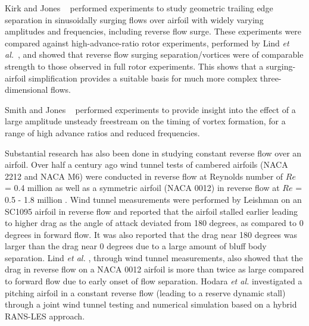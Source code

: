 Kirk and Jones ~\cite{bib:kirk_jones_2019} performed experiments to study geometric trailing edge separation in sinusoidally surging flows over airfoil with widely varying amplitudes and frequencies, including reverse flow surge. These experiments were compared against high-advance-ratio rotor experiments, performed by 
Lind \textit{et al.}~\cite{bib:Lind2018}, and showed that reverse flow surging separation/vortices were of comparable strength to those observed in full rotor experiments. This shows that a surging-airfoil simplification provides a suitable basis for much more complex three-dimensional flows.

Smith and Jones ~\cite{bib:smith2020} performed experiments to provide insight into the effect of a large amplitude unsteady freestream on the timing of vortex formation, for a range of high advance ratios and reduced frequencies. 

Substantial research has also been done in studying constant reverse flow over an airfoil. 
Over half a century ago wind tunnel tests of
cambered airfoils (NACA 2212 and NACA M6) were conducted in reverse
flow at Reynolds number of $Re$ = 0.4 million \cite{bib:naumann1942}  as well as a symmetric airfoil (NACA 0012) in reverse flow at $Re$ = 0.5 - 1.8 million
\cite{bib:critzos1955}.
Wind tunnel measurements were performed by Leishman  on an
SC1095 airfoil in reverse flow \cite{bib:leishman1993} and reported that the airfoil stalled earlier leading to higher drag
as the angle of attack deviated from 180 degrees, as compared to 0 degrees in forward flow. 
It was also reported
that the drag near 180 degrees was larger than the drag near 0 degrees due to a large amount of bluff body separation.
Lind \textit{et al.} \cite{bib:lind2013, bib:lind2014}, through wind tunnel measurements, also showed that the drag in reverse flow on a NACA 0012 airfoil is more than twice as large compared to forward flow
due to early onset of flow separation. 
Hodara \textit{et al.} \cite{bib:hodara2016} investigated a pitching airfoil in a constant reverse flow (leading to a reserve dynamic stall) through a joint wind tunnel testing and numerical simulation based on a hybrid RANS-LES approach.

